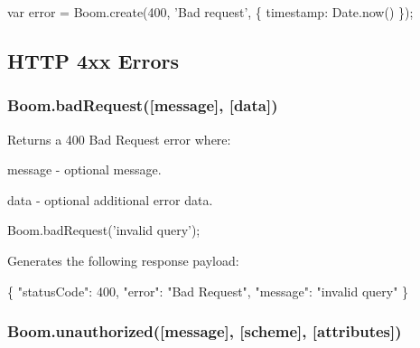 \begin{DoxyCode}
var error = Boom.create(400, 'Bad request', \{ timestamp: Date.now() \});
\end{DoxyCode}


\subsection*{H\+T\+TP 4xx Errors}

\subsubsection*{{\ttfamily Boom.\+bad\+Request(\mbox{[}message\mbox{]}, \mbox{[}data\mbox{]})}}

Returns a 400 Bad Request error where\+:
\begin{DoxyItemize}
\item {\ttfamily message} -\/ optional message.
\item {\ttfamily data} -\/ optional additional error data.
\end{DoxyItemize}


\begin{DoxyCode}
Boom.badRequest('invalid query');
\end{DoxyCode}


Generates the following response payload\+:


\begin{DoxyCode}
\{
    "statusCode": 400,
    "error": "Bad Request",
    "message": "invalid query"
\}
\end{DoxyCode}


\subsubsection*{{\ttfamily Boom.\+unauthorized(\mbox{[}message\mbox{]}, \mbox{[}scheme\mbox{]}, \mbox{[}attributes\mbox{]})}}

